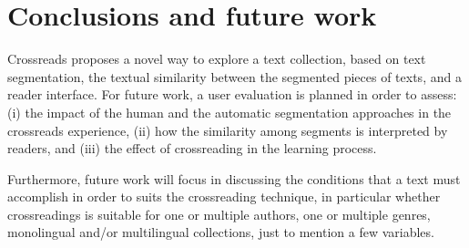 \documentclass{acm_proc_article-sp}
\begin{document}






\section{Conclusions and future work}

Crossreads proposes a novel way to explore a text collection, based on text segmentation, the textual similarity between
the segmented pieces of texts, and a reader interface. 
For future work, a user evaluation is planned in order to assess:
(i) the impact of the human and the automatic segmentation approaches in the crossreads experience, (ii) how the similarity among segments is interpreted by readers, and (iii) the effect of crossreading in the learning process.

Furthermore, future work will focus in discussing the conditions that a text must accomplish in order to suits the crossreading technique, in particular whether crossreadings is suitable for one or multiple authors, one or multiple genres, monolingual and/or multilingual collections, just to mention a few variables.




\end{document}
